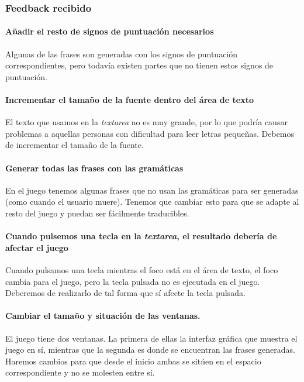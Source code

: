 \subsubsection{Feedback recibido}

\paragraph{Añadir el resto de signos de puntuación necesarios} Algunas de las frases son generadas con los signos de puntuación correspondientes, pero todavía existen partes que no tienen estos signos de puntuación.

\paragraph{Incrementar el tamaño de la fuente dentro del área de texto} El texto que usamos en la \textit{textarea} no es muy grande, por lo que podría causar problemas a aquellas personas con dificultad para leer letras pequeñas. Debemos de incrementar el tamaño de la fuente.

\paragraph{Generar todas las frases con las gramáticas} En el juego tenemos algunas frases que no usan las gramáticas para ser generadas (como cuando el usuario muere). Tenemos que cambiar esto para que se adapte al resto del juego y puedan ser fácilmente traducibles.

\paragraph{Cuando pulsemos una tecla en la \textit{textarea}, el resultado debería de afectar el juego} Cuando pulsamos una tecla mientras el foco está en el área de texto, el foco cambia para el juego, pero la tecla pulsada no es ejecutada en el juego. Deberemos de realizarlo de tal forma que sí afecte la tecla pulsada.

\paragraph{Cambiar el tamaño y situación de las ventanas.} El juego tiene dos ventanas. La primera de ellas la interfaz gráfica que muestra el juego en sí, mientras que la segunda es donde se encuentran las frases generadas. Haremos cambios para que desde el inicio ambas se sitúen en el espacio correspondiente y no se molesten entre sí.

